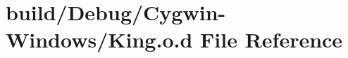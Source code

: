 \hypertarget{_cygwin-_windows_2_king_8o_8d}{}\section{build/\+Debug/\+Cygwin-\/\+Windows/\+King.o.\+d File Reference}
\label{_cygwin-_windows_2_king_8o_8d}
